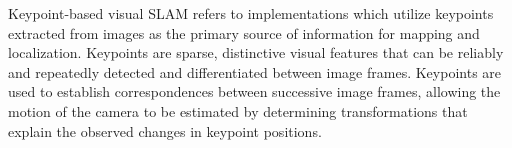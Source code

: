 
Keypoint-based visual SLAM refers to implementations which utilize keypoints extracted from images as the primary source of information for mapping and localization. Keypoints are sparse, distinctive visual features that can be reliably and repeatedly detected and differentiated between image frames. Keypoints are used to establish correspondences between successive image frames, allowing the motion of the camera to be estimated by determining transformations that explain the observed changes in keypoint positions.


